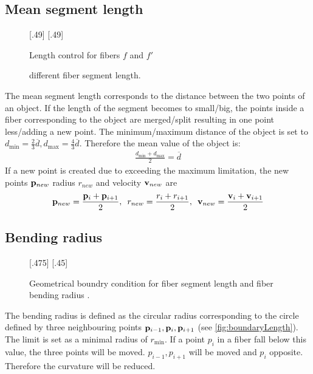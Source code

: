 \subsection{Mean segment length}
% 
\begin{figure}[!t]
    \centering
    \setlength{\tikzwidth}{.45\textwidth}
    [.49\textwidth]{
    }
    [.49\textwidth]{
    }
	\caption{Length control for fibers $f$ and $f'$}
	\label{fig:merge_split}
\end{figure}
% 
% 
\begin{figure}[!t]
    \centering
    \setlength{\tikzwidth}{0.75\textwidth}
    \tikzset{external/export next=false}
	\caption{different fiber segment length.}
	\label{fig:model_length}
\end{figure}
% 
The mean segment length corresponds to the distance between the two points of an object.
If the length of the segment becomes to small/big, the points inside a fiber corresponding to the object are merged/split resulting in one point less/adding a new point.
The minimum/maximum distance of the object is set to $d_{\min} = \frac{2}{3} \overline{d}, d_{\max} = \frac{4}{3}\overline{d}$.
Therefore the mean value of the object is:
\begin{align}
\frac{d_{\min} + d_{\max}}{2} = \overline{d}
\end{align}
% 
If a new point is created due to exceeding the maximum limitation, the new points $\mathbf{p}_{new}$ radius $r_{new}$ and velocity $\mathbf{v}_{new}$ are 
\begin{align}
\mathbf{p}_{new} = \frac{\mathbf{p}_{i} + \mathbf{p}_{i+1}}{2},\enspace
r_{new} = \frac{r_{i} + r_{i+1}}{2},\enspace
\mathbf{v}_{new} = \frac{\mathbf{v}_{i} + \mathbf{v}_{i+1}}{2}
\end{align}
% 
\subsection{Bending radius}
% 
\begin{figure}[!t]
    \centering
    \def\tikzheight{.40\textwidth}
    [.475\textwidth]{
    }\hfill
    [.45\textwidth]{
    }
	\caption{Geometrical boundry condition for fiber segment length \segLength and fiber bending radius \segRadius.}
	\label{fig:model_circle}
\end{figure}
% 
The bending radius is defined as the circular radius corresponding to the circle defined by three neighbouring points $\mathbf{p}_{i-1}, \mathbf{p}_{i}, \mathbf{p}_{i+1}$ (see \cref{fig:boundaryLength}). 
The limit is set as a minimal radius of $r_{\min}$.
If a point $p_{i}$ in a fiber fall below this value, the three points will be moved.
$p_{i-1},p_{i+1}$ will be moved \dummy and $p_{i}$ opposite.
Therefore the curvature will be reduced.
\\
% 
